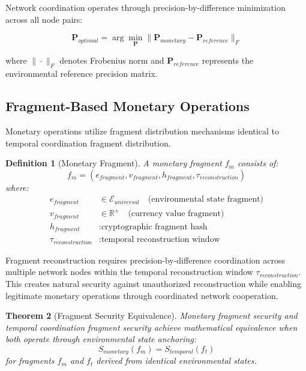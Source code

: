 \documentclass[12pt,a4paper]{article}
\newtheorem{theorem}{Theorem}
\newtheorem{definition}[theorem]{Definition}
\begin{document}
Network coordination operates through precision-by-difference minimization across all node pairs:

\begin{equation}
\mathbf{P}_{optimal} = \arg\min_{\mathbf{P}} \|\mathbf{P}_{monetary} - \mathbf{P}_{reference}\|_F
\end{equation}

where $\|\cdot\|_F$ denotes Frobenius norm and $\mathbf{P}_{reference}$ represents the environmental reference precision matrix.

\subsection{Fragment-Based Monetary Operations}

Monetary operations utilize fragment distribution mechanisms identical to temporal coordination fragment distribution.

\begin{definition}[Monetary Fragment]
A monetary fragment $f_m$ consists of:
\begin{equation}
f_m = (e_{fragment}, v_{fragment}, h_{fragment}, \tau_{reconstruction})
\end{equation}
where:
\begin{align}
e_{fragment} &\in \mathcal{E}_{universal} \quad \text{(environmental state fragment)} \\
v_{fragment} &\in \mathbb{R}^+ \quad \text{(currency value fragment)} \\
h_{fragment} &: \text{cryptographic fragment hash} \\
\tau_{reconstruction} &: \text{temporal reconstruction window}
\end{align}
\end{definition}

Fragment reconstruction requires precision-by-difference coordination across multiple network nodes within the temporal reconstruction window $\tau_{reconstruction}$. This creates natural security against unauthorized reconstruction while enabling legitimate monetary operations through coordinated network cooperation.

\begin{theorem}[Fragment Security Equivalence]
Monetary fragment security and temporal coordination fragment security achieve mathematical equivalence when both operate through environmental state anchoring:
\begin{equation}
S_{monetary}(f_m) = S_{temporal}(f_t)
\end{equation}
for fragments $f_m$ and $f_t$ derived from identical environmental states.
\end{theorem}
\end{document}
